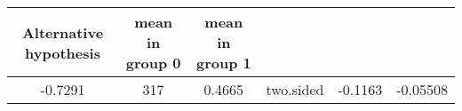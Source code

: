 \documentclass[11pt,]{article}
\newenvironment{Shaded}{\begin{snugshade}}{\end{snugshade}}
\newcommand{\KeywordTok}[1]{\textcolor[rgb]{0.13,0.29,0.53}{\textbf{#1}}}
\newcommand{\DecValTok}[1]{\textcolor[rgb]{0.00,0.00,0.81}{#1}}
\newcommand{\OperatorTok}[1]{\textcolor[rgb]{0.81,0.36,0.00}{\textbf{#1}}}
\newcommand{\NormalTok}[1]{#1}
\begin{document}
\begin{longtable}[]{@{}cccccc@{}}
\begin{minipage}[b]{0.16\columnwidth}
Alternative hypothesis\strut
\end{minipage} & \begin{minipage}[b]{0.12\columnwidth}\centering\strut
mean in group 0\strut
\end{minipage} & \begin{minipage}[b]{0.12\columnwidth}\centering\strut
mean in group 1\strut
\end{minipage}\tabularnewline
\midrule
\endhead
\begin{minipage}[t]{0.14\columnwidth}\centering\strut
-0.7291\strut
\end{minipage} & \begin{minipage}[t]{0.07\columnwidth}\centering\strut
317\strut
\end{minipage} & \begin{minipage}[t]{0.12\columnwidth}\centering\strut
0.4665\strut
\end{minipage} & \begin{minipage}[t]{0.16\columnwidth}\centering\strut
two.sided\strut
\end{minipage} & \begin{minipage}[t]{0.12\columnwidth}\centering\strut
-0.1163\strut
\end{minipage} & \begin{minipage}[t]{0.12\columnwidth}\centering\strut
-0.05508\strut
\end{minipage}\tabularnewline
\bottomrule
\end{longtable}

\begin{Shaded}
\end{Shaded}
\end{document}
